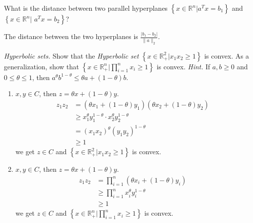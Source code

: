\begin{problem}[2.5]
    What is the distance between two parallel hyperplanes $\left\{x \in \mathbb{R}^n | a^Tx = b_1\right\}$ and $\left\{x \in \mathbb{R}^n| \right.$ $\left. a^Tx = b_2\right\}$?

    \Answer The distance between the two hyperplanes is $\frac{|b_1 - b_2|}{\|a\|_2}$.
\end{problem}

\begin{problem}[2.11]
    \textit{Hyperbolic sets.} Show that the \textit{Hyperbolic set} $\left\{x \in \mathbb{R}_+^2 | x_1x_2 \ge 1\right\}$ is convex. As a generalization, show that $\left\{x \in \mathbb{R}^n_+ | \prod_{i = 1}^n x_i \ge 1\right\}$ is convex. \textit{Hint.} If $a, b \ge 0$ and $0 \le \theta \le 1$, then $a^\theta b^{1 - \theta} \le \theta a + (1 - \theta)b$.
    
    \Answer \begin{enumerate}
        \item $x, y \in C$, then $z = \theta x + (1 - \theta)y$.
        \begin{align*}
            z_1z_2 &= (\theta x_1 + (1 - \theta)y_1)(\theta x_2 + (1 - \theta)y_2) \\
            &\ge x_1^\theta y_1^{1 - \theta} \cdot x_2^\theta y_2^{1 - \theta} \\
            &= (x_1x_2)^\theta (y_1y_2)^{1 - \theta}\\
            &\ge 1
        \end{align*}
        we get $z \in C$ and $\left\{x \in \mathbb{R}_+^2 | x_1x_2 \ge 1\right\}$ is convex.
        \item $x, y \in C$, then $z = \theta x + (1 - \theta)y$.
        \begin{align*}
            z_1z_2 &= \prod_{i = 1}^n(\theta x_i + (1 - \theta)y_i)\\
            &\ge \prod_{i = 1}^n x_i^\theta y_i^{1 - \theta} \\
            &\ge 1
        \end{align*}
        we get $z \in C$ and $\left\{x \in \mathbb{R}^n_+ | \prod_{i = 1}^n x_i \ge 1\right\}$ is convex.
    \end{enumerate}
\end{problem}

